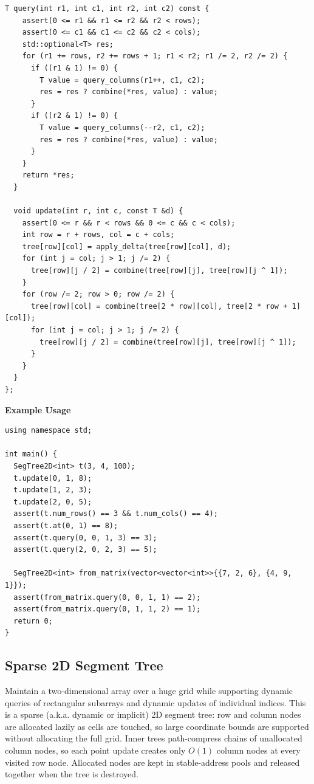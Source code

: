 \begin{lstlisting}[style=cpp]
  T query(int r1, int c1, int r2, int c2) const {
    assert(0 <= r1 && r1 <= r2 && r2 < rows);
    assert(0 <= c1 && c1 <= c2 && c2 < cols);
    std::optional<T> res;
    for (r1 += rows, r2 += rows + 1; r1 < r2; r1 /= 2, r2 /= 2) {
      if ((r1 & 1) != 0) {
        T value = query_columns(r1++, c1, c2);
        res = res ? combine(*res, value) : value;
      }
      if ((r2 & 1) != 0) {
        T value = query_columns(--r2, c1, c2);
        res = res ? combine(*res, value) : value;
      }
    }
    return *res;
  }

  void update(int r, int c, const T &d) {
    assert(0 <= r && r < rows && 0 <= c && c < cols);
    int row = r + rows, col = c + cols;
    tree[row][col] = apply_delta(tree[row][col], d);
    for (int j = col; j > 1; j /= 2) {
      tree[row][j / 2] = combine(tree[row][j], tree[row][j ^ 1]);
    }
    for (row /= 2; row > 0; row /= 2) {
      tree[row][col] = combine(tree[2 * row][col], tree[2 * row + 1][col]);
      for (int j = col; j > 1; j /= 2) {
        tree[row][j / 2] = combine(tree[row][j], tree[row][j ^ 1]);
      }
    }
  }
};
\end{lstlisting}
\textbf{Example Usage}\par
\begin{lstlisting}[style=cpp]
using namespace std;

int main() {
  SegTree2D<int> t(3, 4, 100);
  t.update(0, 1, 8);
  t.update(1, 2, 3);
  t.update(2, 0, 5);
  assert(t.num_rows() == 3 && t.num_cols() == 4);
  assert(t.at(0, 1) == 8);
  assert(t.query(0, 0, 1, 3) == 3);
  assert(t.query(2, 0, 2, 3) == 5);

  SegTree2D<int> from_matrix(vector<vector<int>>{{7, 2, 6}, {4, 9, 1}});
  assert(from_matrix.query(0, 0, 1, 1) == 2);
  assert(from_matrix.query(0, 1, 1, 2) == 1);
  return 0;
}
\end{lstlisting}
\subsection{Sparse 2D Segment Tree}
\label{sec:2.6.2}
Maintain a two-dimensional array over a huge grid while supporting dynamic queries of rectangular subarrays and dynamic updates of individual indices. This is a sparse (a.k.a. dynamic or implicit) 2D segment tree: row and column nodes are allocated lazily as cells are touched, so large coordinate bounds are supported without allocating the full grid. Inner trees path-compress chains of unallocated column nodes, so each point update creates only $O(1)$ column nodes at every visited row node. Allocated nodes are kept in stable-address pools and released together when the tree is destroyed.

